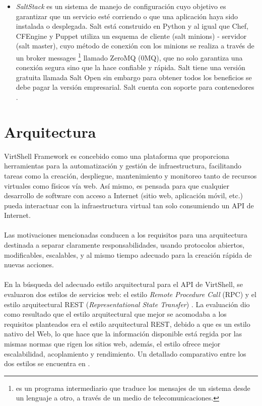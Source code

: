 \documentclass[conference, spanish]{IEEEtran}
\begin{document}
\begin{itemize}
\item \emph{SaltStack} es un sistema de manejo de configuración cuyo objetivo es garantizar que un servicio esté corriendo o que una aplicación haya sido instalada o desplegada. Salt está construido en Python y al igual que Chef, CFEngine y Puppet utiliza un esquema de cliente (salt minions) - servidor (salt master), cuyo método de conexión con los minions se realiza a través de un broker messages \footnote{es un programa intermediario que traduce los mensajes de un sistema desde un lenguaje a otro, a través de un medio de telecomunicaciones.} llamado ZeroMQ (0MQ), que no solo garantiza una conexión segura sino que la hace confiable y rápida. Salt tiene una versión gratuita llamada Salt Open sin embargo para obtener todos los beneficios se debe pagar la versión empresarial. Salt cuenta con soporte para contenedores \cite{Salt15}.

\end{itemize}




\section{Arquitectura}
VirtShell Framework es concebido como una plataforma que proporciona herramientas para la automatización y gestión de infraestructura, facilitando tareas como la creación, despliegue, mantenimiento y monitoreo tanto de recursos virtuales como físicos vía web. Así mismo, es pensada para que cualquier desarrollo de software con acceso a Internet (sitio web, aplicación móvil, etc.) pueda interactuar con la infraestructura virtual tan solo consumiendo un API de Internet.\\
\\
Las motivaciones mencionadas conducen a los requisitos para una arquitectura destinada a separar claramente responsabilidades, usando protocolos abiertos, modificables, escalables, y al mismo tiempo adecuado para la creación rápida de nuevas acciones. \\
\\
En la búsqueda del adecuado estilo arquitectural para el API de VirtShell, se evaluaron dos estilos de servicios web: el estilo \emph{Remote Procedure Call} (RPC) y el estilo arquitectural REST (\emph{Representational State Transfer}) \cite{fielding00}. La evaluación dio como resultado que el estilo arquitectural que mejor se acomodaba a los requisitos planteados era el estilo arquitectural REST, debido a que es un estilo nativo del Web, lo que hace que la información disponible está regida por las mismas normas que rigen los sitios web, además, el estilo ofrece mejor escalabilidad, acoplamiento y rendimiento. Un detallado comparativo entre los dos estilos se encuentra en \cite{Xinyang09}. 
\end{document}
